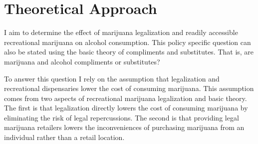 \documentclass[11pt]{article}
\begin{document}

\section{Theoretical Approach}

I aim to determine the effect of marijuana legalization and readily accessible recreational marijuana on alcohol consumption. This policy specific question can also be stated using the basic theory of compliments and substitutes. That is, are marijuana and alcohol compliments or substitutes? \par


To answer this question  I rely on the assumption that legalization and recreational dispensaries lower the cost of consuming marijuana. This assumption comes from two aspects of recreational marijuana legalization and basic theory. The first is that legalization directly lowers the cost of consuming marijuana by eliminating the risk of legal repercussions. The second is that providing legal marijuana retailers lowers the inconveniences of purchasing marijuana from an individual rather than a retail location. \par
\end{document}
